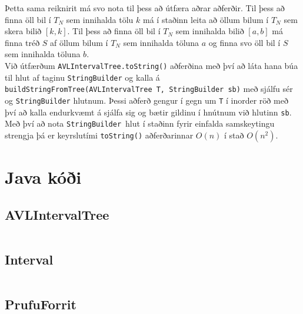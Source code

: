 \documentclass[a4paper,oneside]{article}
\begin{document}
\noindent
Þetta sama reiknirit má svo nota til þess að útfæra aðrar aðferðir.
Til þess að finna öll bil í $T_N$ sem innihalda tölu $k$ má í staðinn leita að öllum bilum í $T_N$ sem skera bilið $[k,k]$.
Til þess að finna öll bil í $T_N$ sem innihalda bilið $[a,b]$ má finna tréð $S$ af öllum bilum í $T_N$ sem innihalda töluna $a$ og finna svo öll bil í $S$ sem innihalda töluna $b$. \\

\noindent
Við útfærðum \texttt{AVLIntervalTree.toString()} aðferðina með því að láta hana búa til hlut af taginu \texttt{StringBuilder} og kalla á \texttt{buildStringFromTree(AVLIntervalTree T, StringBuilder sb)} með sjálfu sér og \texttt{StringBuilder} hlutnum. Þessi aðferð gengur í gegn um \texttt{T} í inorder röð með því að kalla endurkvæmt á sjálfa sig og bætir gildinu í hnútnum við hlutinn \texttt{sb}. Með því að nota \texttt{StringBuilder} hlut í staðinn fyrir einfalda samskeytingu strengja þá er keyrslutími \texttt{toString()} aðferðarinnar $O(n)$ í stað $O(n^2)$.



\pagebreak
\section{Java kóði}
\subsection{AVLIntervalTree}
\inputminted[]{java}{../AVLIntervalTree.java}

\subsection{Interval}
\inputminted[]{java}{../Interval.java}

\subsection{PrufuForrit}
\inputminted[]{java}{../PrufuForrit.java}
\end{document}
